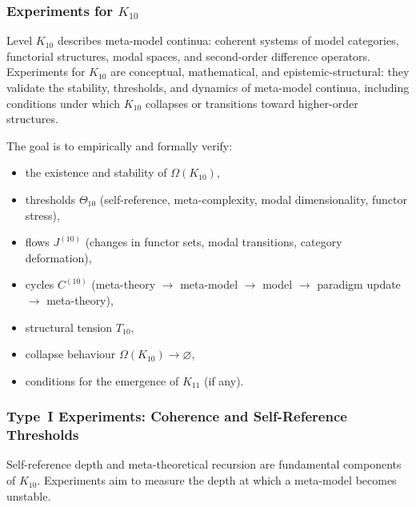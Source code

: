 
\subsubsection{Experiments for $K_{10}$}
\label{sec:experiments-k10}

Level $K_{10}$ describes meta-model continua: coherent systems of
model categories, functorial structures, modal spaces, and
second-order difference operators.
Experiments for $K_{10}$ are conceptual, mathematical, and
epistemic-structural: they validate the stability, thresholds,
and dynamics of meta-model continua, including conditions under which
$K_{10}$ collapses or transitions toward higher-order structures.

The goal is to empirically and formally verify:

\begin{itemize}
    \item the existence and stability of $\Omega(K_{10})$,
    \item thresholds $\Theta_{10}$ (self-reference, meta-complexity,
          modal dimensionality, functor stress),
    \item flows $J^{(10)}$ (changes in functor sets, modal transitions,
          category deformation),
    \item cycles $C^{(10)}$ (meta-theory $\to$ meta-model $\to$ model
          $\to$ paradigm update $\to$ meta-theory),
    \item structural tension $T_{10}$,
    \item collapse behaviour $\Omega(K_{10}) \to \varnothing$,
    \item conditions for the emergence of $K_{11}$ (if any).
\end{itemize}



\subsubsection{Type~I Experiments: Coherence and Self-Reference Thresholds}

Self-reference depth and meta-theoretical recursion are fundamental
components of $K_{10}$.
Experiments aim to measure the depth at which a meta-model becomes
unstable.

